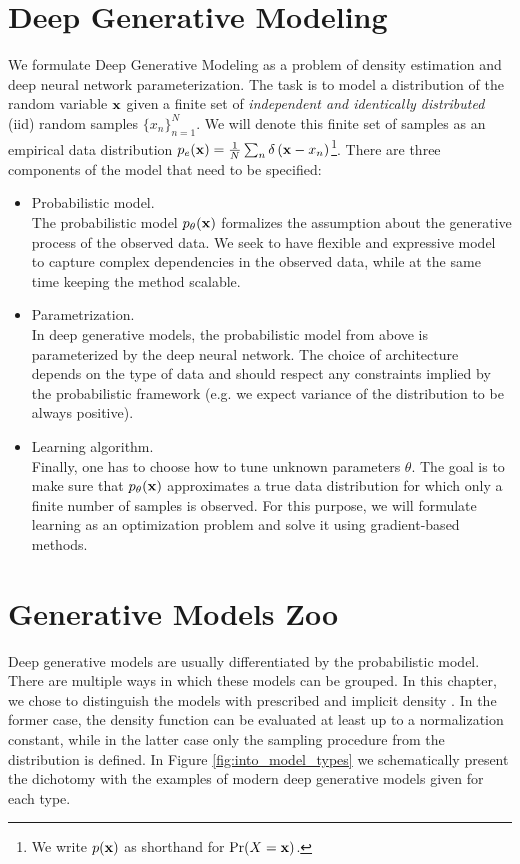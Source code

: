 \section{Deep Generative Modeling}\label{sec:intro_generative_models_types}
We formulate Deep Generative Modeling as a problem of density estimation and deep neural network parameterization. 
The task is to model a distribution of the random variable ${\mathbf{x}}$ given a finite set of \textit{independent and identically distributed} (iid) random samples $\{x_n\}_{n=1}^N$. 
We will denote this finite set of samples as an empirical data distribution $p_e({\mathbf{x}}) = \frac1N \sum_n \delta\left({\mathbf{x}} - x_n\right)$\footnote{We write $p({\mathbf{x}})$ as shorthand for $\text{Pr}(X = {\mathbf{x}})$.}. 
There are three components of the model that need to be specified:
\begin{itemize}
\item Probabilistic model. 
\\
The probabilistic model $p_{\theta}({\mathbf{x}})$ formalizes the assumption about the generative process of the observed data. 
We seek to have flexible and expressive model to capture complex dependencies in the observed data, while at the same time keeping the method scalable.

\item Parametrization.\\
In deep generative models, the probabilistic model from above is parameterized by the deep neural network. 
The choice of architecture depends on the type of data and should respect any constraints implied by the probabilistic framework (e.g. we expect variance of the distribution to be always positive).

\item Learning algorithm. \\
Finally, one has to choose how to tune unknown parameters $\theta$. The goal is to make sure that $p_{\theta}({\mathbf{x}})$ approximates a true data distribution for which only a finite number of samples is observed. For this purpose, we will formulate learning as an optimization problem and solve it using gradient-based methods. 
\end{itemize}

\section{Generative Models Zoo}\label{subsec:intro_gen_zoo}
Deep generative models are usually differentiated by the probabilistic model. 
There are multiple ways in which these models can be grouped. In this chapter, we chose to distinguish the models with prescribed and implicit density \citep{diggle1984monte}. In the former case, the density function can be evaluated at least up to a normalization constant, while in the latter case only the sampling procedure from the distribution is defined. 
In Figure \ref{fig:into_model_types} we schematically present the dichotomy with the examples of modern deep generative models given for each type.

